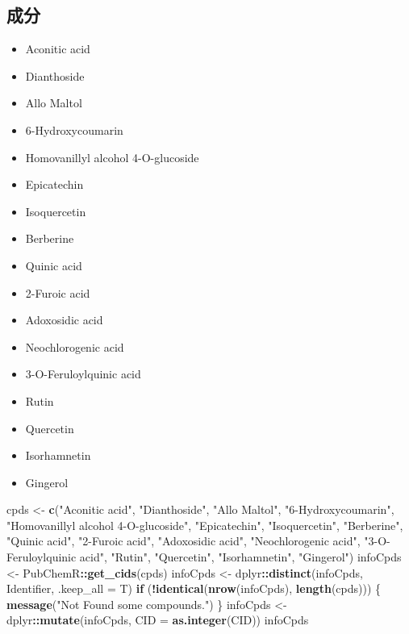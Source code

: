 \documentclass[
]{article}
\newenvironment{Shaded}{\begin{snugshade}}{\end{snugshade}}
\newcommand{\ControlFlowTok}[1]{\textcolor[rgb]{0.13,0.29,0.53}{\textbf{#1}}}
\newcommand{\DataTypeTok}[1]{\textcolor[rgb]{0.13,0.29,0.53}{#1}}
\newcommand{\KeywordTok}[1]{\textcolor[rgb]{0.13,0.29,0.53}{\textbf{#1}}}
\newcommand{\NormalTok}[1]{#1}
\newcommand{\OperatorTok}[1]{\textcolor[rgb]{0.81,0.36,0.00}{\textbf{#1}}}
\newcommand{\StringTok}[1]{\textcolor[rgb]{0.31,0.60,0.02}{#1}}
\providecommand{\tightlist}{%
  \setlength{\itemsep}{0pt}\setlength{\parskip}{0pt}}
\begin{document}
\hypertarget{ux6210ux5206}{%
\subsection{成分}\label{ux6210ux5206}}

\begin{itemize}
\tightlist
\item
  Aconitic acid
\item
  Dianthoside
\item
  Allo Maltol
\item
  6-Hydroxycoumarin
\item
  Homovanillyl alcohol 4-O-glucoside
\item
  Epicatechin
\item
  Isoquercetin
\item
  Berberine
\item
  Quinic acid
\item
  2-Furoic acid
\item
  Adoxosidic acid
\item
  Neochlorogenic acid
\item
  3-O-Feruloylquinic acid
\item
  Rutin
\item
  Quercetin
\item
  Isorhamnetin
\item
  Gingerol
\end{itemize}

\begin{Shaded}
\begin{Highlighting}[]
\NormalTok{cpds \textless{}{-}}\StringTok{ }\KeywordTok{c}\NormalTok{(}\StringTok{"Aconitic acid"}\NormalTok{, }\StringTok{"Dianthoside"}\NormalTok{, }\StringTok{"Allo Maltol"}\NormalTok{, }\StringTok{"6{-}Hydroxycoumarin"}\NormalTok{, }\StringTok{"Homovanillyl alcohol 4{-}O{-}glucoside"}\NormalTok{,}
  \StringTok{"Epicatechin"}\NormalTok{, }\StringTok{"Isoquercetin"}\NormalTok{, }\StringTok{"Berberine"}\NormalTok{, }\StringTok{"Quinic acid"}\NormalTok{, }\StringTok{"2{-}Furoic acid"}\NormalTok{, }\StringTok{"Adoxosidic acid"}\NormalTok{,}
  \StringTok{"Neochlorogenic acid"}\NormalTok{, }\StringTok{"3{-}O{-}Feruloylquinic acid"}\NormalTok{, }\StringTok{"Rutin"}\NormalTok{, }\StringTok{"Quercetin"}\NormalTok{,}
  \StringTok{"Isorhamnetin"}\NormalTok{, }\StringTok{"Gingerol"}\NormalTok{)}
\NormalTok{infoCpds \textless{}{-}}\StringTok{ }\NormalTok{PubChemR}\OperatorTok{::}\KeywordTok{get\_cids}\NormalTok{(cpds)}
\NormalTok{infoCpds \textless{}{-}}\StringTok{ }\NormalTok{dplyr}\OperatorTok{::}\KeywordTok{distinct}\NormalTok{(infoCpds, Identifier, }\DataTypeTok{.keep\_all =}\NormalTok{ T)}
\ControlFlowTok{if}\NormalTok{ (}\OperatorTok{!}\KeywordTok{identical}\NormalTok{(}\KeywordTok{nrow}\NormalTok{(infoCpds), }\KeywordTok{length}\NormalTok{(cpds))) \{}
  \KeywordTok{message}\NormalTok{(}\StringTok{"Not Found some compounds."}\NormalTok{)}
\NormalTok{\}}
\NormalTok{infoCpds \textless{}{-}}\StringTok{ }\NormalTok{dplyr}\OperatorTok{::}\KeywordTok{mutate}\NormalTok{(infoCpds, }\DataTypeTok{CID =} \KeywordTok{as.integer}\NormalTok{(CID))}
\NormalTok{infoCpds}
\end{Highlighting}
\end{Shaded}
\end{document}
